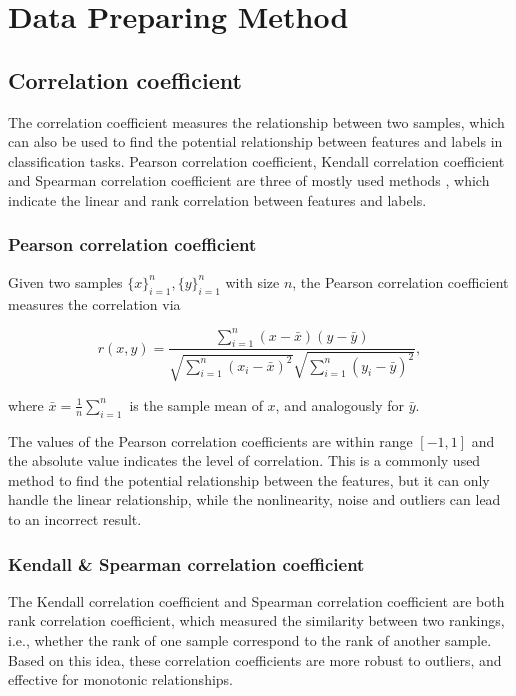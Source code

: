 \documentclass[11pt]{article}
\begin{document}
\section{Data Preparing Method}

\subsection{Correlation coefficient}

The correlation coefficient measures the relationship between two samples, which can also be used to find the potential relationship between features and labels in classification tasks. Pearson correlation coefficient, Kendall correlation coefficient and Spearman correlation coefficient are three of mostly used methods \cite{abdi2007kendall} \cite{hauke2011comparison}, which indicate the linear and rank correlation between features and labels.

\subsubsection{Pearson correlation coefficient}

Given two samples $\{x\}_{i=1}^n, \{y\}_{i=1}^n$ with size $n$, the Pearson correlation coefficient measures the correlation via

$$
  r (x, y) = \frac{\sum_{i=1}^n (x - \bar{x}) (y - \bar{y})}{\sqrt{\sum_{i=1}^n (x_i - \bar{x})^2} \sqrt{\sum_{i=1}^n (y_i - \bar{y})^2}},
$$

\noindent where $\bar{x} = \frac{1}{n} \sum_{i=1}^n$ is the sample mean of $x$, and analogously for $\bar{y}$.

The values of the Pearson correlation coefficients are within range $[-1, 1]$ and the absolute value indicates the level of correlation. This is a commonly used method to find the potential relationship between the features, but it can only handle the linear relationship, while the nonlinearity, noise and outliers can lead to an incorrect result.

\subsubsection{Kendall \& Spearman correlation coefficient}

The Kendall correlation coefficient and Spearman correlation coefficient are both rank correlation coefficient, which measured the similarity between two rankings, i.e., whether the rank of one sample correspond to the rank of another sample. Based on this idea, these correlation coefficients are more robust to outliers, and effective for monotonic relationships.
\end{document}
